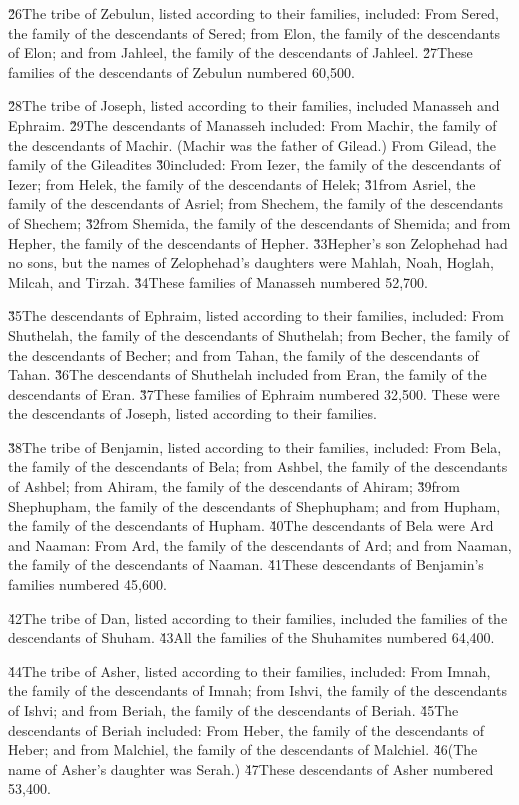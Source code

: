\v{26}The tribe of Zebulun, listed according to their families, included: From Sered, the family of the descendants of Sered; from Elon, the family of the descendants of Elon; and from Jahleel, the family of the descendants of Jahleel. \v{27}These families of the descendants of Zebulun numbered 60,500.

\v{28}The tribe of Joseph, listed according to their families, included Manasseh and Ephraim. \v{29}The descendants of Manasseh included: From Machir, the family of the descendants of Machir. (Machir was the father of Gilead.) From Gilead, the family of the Gileadites \v{30}included: From Iezer, the family of the descendants of Iezer; from Helek, the family of the descendants of Helek; \v{31}from Asriel, the family of the descendants of Asriel; from Shechem, the family of the descendants of Shechem; \v{32}from Shemida, the family of the descendants of Shemida; and from Hepher, the family of the descendants of Hepher. \v{33}Hepher's son Zelophehad had no sons, but the names of Zelophehad's daughters were Mahlah, Noah, Hoglah, Milcah, and Tirzah. \v{34}These families of Manasseh numbered 52,700.

\v{35}The descendants of Ephraim, listed according to their families, included: From Shuthelah, the family of the descendants of Shuthelah; from Becher, the family of the descendants of Becher; and from Tahan, the family of the descendants of Tahan. \v{36}The descendants of Shuthelah included from Eran, the family of the descendants of Eran. \v{37}These families of Ephraim numbered 32,500. These were the descendants of Joseph, listed according to their families.

\v{38}The tribe of Benjamin, listed according to their families, included: From Bela, the family of the descendants of Bela; from Ashbel, the family of the descendants of Ashbel; from Ahiram, the family of the descendants of Ahiram; \v{39}from Shephupham, the family of the descendants of Shephupham; and from Hupham, the family of the descendants of Hupham. \v{40}The descendants of Bela were Ard and Naaman: From Ard, the family of the descendants of Ard; and from Naaman, the family of the descendants of Naaman. \v{41}These descendants of Benjamin's families numbered 45,600.

\v{42}The tribe of Dan, listed according to their families, included the families of the descendants of Shuham. \v{43}All the families of the Shuhamites numbered 64,400.

\v{44}The tribe of Asher, listed according to their families, included: From Imnah, the family of the descendants of Imnah; from Ishvi, the family of the descendants of Ishvi; and from Beriah, the family of the descendants of Beriah. \v{45}The descendants of Beriah included: From Heber, the family of the descendants of Heber; and from Malchiel, the family of the descendants of Malchiel. \v{46}(The name of Asher's daughter was Serah.) \v{47}These descendants of Asher numbered 53,400.

